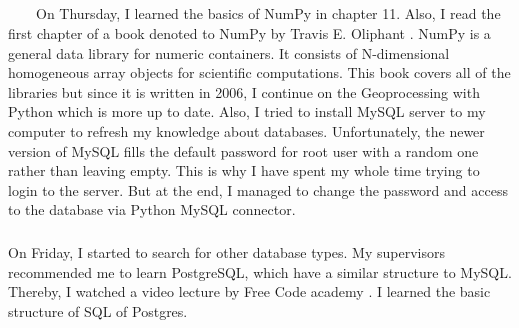 \documentclass[a4paper]{article}
\begin{document}
    \subparagraph{}
        On Thursday, I learned the basics of NumPy in chapter 11. Also, I read the first chapter of a book denoted to NumPy by Travis E. Oliphant \cite{numpybook}. NumPy is a general data library for numeric containers. It consists of N-dimensional homogeneous array objects for scientific computations. This book covers all of the libraries but since it is written in 2006, I continue on the Geoprocessing with Python which is more up to date. Also, I tried to install MySQL server to my computer to refresh my knowledge about databases. Unfortunately, the newer version of MySQL fills the default password for root user with a random one rather than leaving empty. This is why I have spent my whole time trying to login to the server. But at the end, I managed to change the password and access to the database via Python MySQL connector.
    
    \subparagraph{}
    On Friday, I started to search for other database types. My supervisors recommended me to learn PostgreSQL, which have a similar structure to MySQL. Thereby, I watched a video lecture by Free Code academy \cite{postgresql}. I learned the basic structure of SQL of Postgres.

    \printbibliography    
\end{document}
